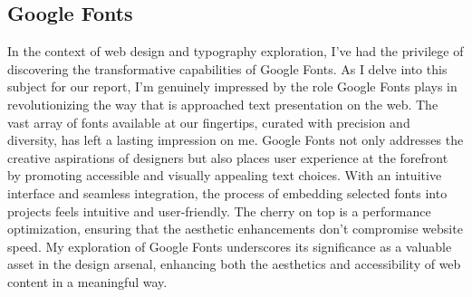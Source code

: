 \subsection{Google Fonts}
In the context of web design and typography exploration, I've had the privilege of discovering the transformative capabilities of Google Fonts. As I delve into this subject for our report, I'm genuinely impressed by the role Google Fonts plays in revolutionizing the way that is approached text presentation on the web. The vast array of fonts available at our fingertips, curated with precision and diversity, has left a lasting impression on me. Google Fonts not only addresses the creative aspirations of designers but also places user experience at the forefront by promoting accessible and visually appealing text choices. With an intuitive interface and seamless integration, the process of embedding selected fonts into projects feels intuitive and user-friendly. The cherry on top is a performance optimization, ensuring that the aesthetic enhancements don't compromise website speed. My exploration of Google Fonts underscores its significance as a valuable asset in the design arsenal, enhancing both the aesthetics and accessibility of web content in a meaningful way.
